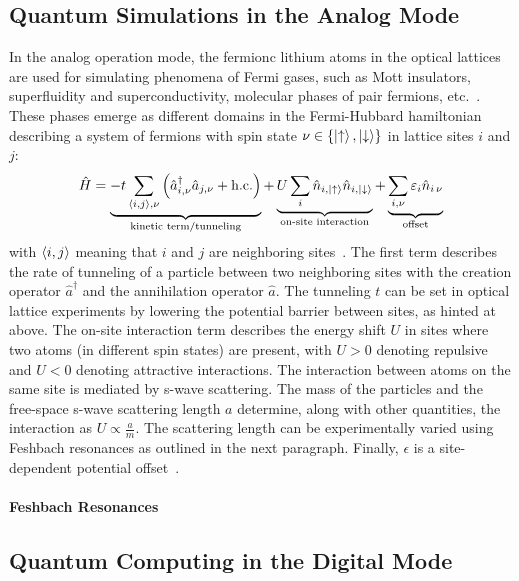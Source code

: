 \subsection*{Quantum Simulations in the Analog Mode}
In the analog operation mode, the fermionc lithium atoms in the optical lattices are used for simulating phenomena of Fermi gases, such as Mott insulators, superfluidity and  superconductivity, molecular phases of pair fermions, etc.~\cite{bloch_quantum_2012}. These phases emerge as different domains in the Fermi-Hubbard hamiltonian describing a system of fermions with spin state $\nu \in \{\Ket{\uparrow}, \Ket{\downarrow}\}$ in lattice sites $i$ and $j$:
\begin{align}
    \hat H =
    \underbrace{-t \sum\limits_{\Braket{i,j}, \nu} \left(\hat a^\dagger_{i, \nu} \hat a_{j, \nu} + \text{h.c.}\right)}_\text{kinetic term/tunneling}
    + \underbrace{U \sum\limits_i \hat n_{i, \Ket{\uparrow}} \hat n_{i, \Ket{\downarrow}}}_\text{on-site interaction}
    + \underbrace{\sum\limits_{i, \nu} \epsilon_{i} \hat n_{i\, \nu}}_\text{offset}
\end{align}
with $\Braket{i,j}$ meaning that $i$ and $j$ are neighboring sites~\cite{hubbard_electron_1963,esslinger_fermi-hubbard_2010}. The first term describes the rate of tunneling of a particle between two neighboring sites with the creation operator $\hat a^\dagger$ and the annihilation operator $\hat a$. The tunneling $t$ can be set in optical lattice experiments by lowering the potential barrier between sites, as hinted at above. The on-site interaction term describes the energy shift $U$ in sites where two atoms (in different spin states) are present, with $U > 0$ denoting repulsive and $U < 0$ denoting attractive interactions. The interaction between atoms on the same site is mediated by s-wave scattering. The mass of the particles and the free-space s-wave scattering length $a$ determine, along with other quantities, the interaction as $U \propto \frac{a}{m}$. The scattering length can be experimentally varied using Feshbach resonances as outlined in the next paragraph. Finally, $\epsilon$ is a site-dependent potential offset~\cite{esslinger_fermi-hubbard_2010}.

\paragraph*{Feshbach Resonances}


\subsection*{Quantum Computing in the Digital Mode}


